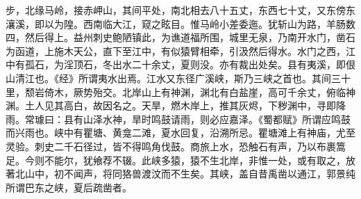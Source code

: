 \documentclass[12pt,UTF8]{ctexbook}
\begin{document}
步，北缘马岭，接赤岬山，其间平处，南北相去八十五丈，东西七十丈，又东傍东瀼溪，即以为隍。西南临大江，窥之眩目。惟马岭小差委迤。犹斩山为路，羊肠数四，然后得上。益州刺史鲍陋镇此，为谯道福所围，城里无泉，乃南开水门，凿石为函道，上施木天公，直下至江中，有似猿臂相牵，引汲然后得水。水门之西，江中有孤石，为淫顶石，冬出水二十余丈，夏则没。亦有裁出处矣。县有夷溪，即佷山清江也。《经》所谓夷水出焉。江水又东径广溪峡，斯乃三峡之首也。其间三十里，颓岩倚木，厥势殆交。北岸山上有神渊，渊北有白盐崖，高可千余丈，俯临神渊。土人见其高白，故因名之。天旱，燃木岸上，推其灰烬，下秽渊中，寻即降雨。常璩曰：县有山泽水神，旱时鸣鼓请雨，则必应嘉泽。《蜀都赋》所谓应鸣鼓而兴雨也。峡中有瞿塘、黄龛二滩，夏水回复，沿溯所忌。瞿塘滩上有神庙，尤至灵验。刺史二千石径过，皆不得鸣角伐鼓。商旅上水，恐触石有声，乃以布裹篙足。今则不能尔，犹飨荐不辍。此峡多猿，猿不生北岸，非惟一处，或有取之，放著北山中，初不闻声，将同狢兽渡汶而不生矣。其峡，盖自昔禹凿以通江，郭景纯所谓巴东之峡，夏后疏凿者。
\end{document}
